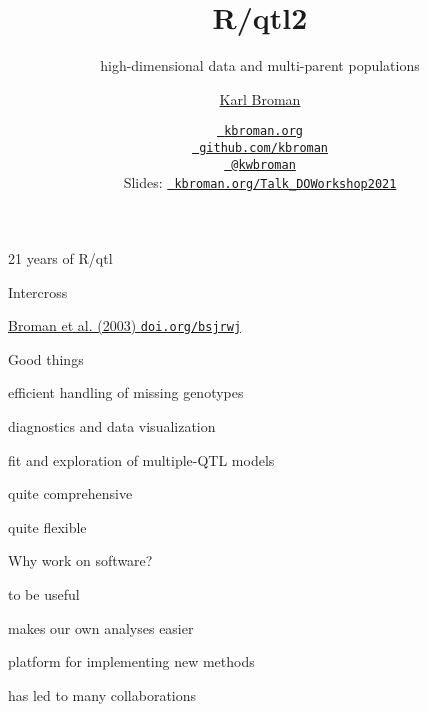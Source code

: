\documentclass[12pt,t,aspectratio=169]{beamer}
\title{R/qtl2}
\subtitle{high-dimensional data and multi-parent populations}
\author{\href{https://kbroman.org}{Karl Broman}}
\institute{Biostatistics \& Medical Informatics, UW{\textendash}Madison}
\date{\href{https://kbroman.org}{\tt \scriptsize \color{foreground} kbroman.org}
\\[-4pt]
\href{https://github.com/kbroman}{\tt \scriptsize \color{foreground} github.com/kbroman}
\\[-4pt]
\href{https://twitter.com/kwbroman}{\tt \scriptsize \color{foreground} @kwbroman}
\\[2pt]
\scriptsize {\lolit Slides:} \href{https://kbroman.org/Talk_DOWorkshop2021}{\tt \scriptsize
  \color{foreground} kbroman.org/Talk\_DOWorkshop2021}
}
\begin{document}
{
 }



\begin{frame}[c]{21 years of R/qtl}


\end{frame}





\begin{frame}[c]{Intercross}
\end{frame}



\begin{frame}[c]{}



\hfill
\href{https://doi.org/10.1093/bioinformatics/btg112}{\scriptsize
  \lolit Broman et al. (2003) {\tt doi.org/bsjrwj}}

\end{frame}






\begin{frame}{Good things}

\bbi
  \item efficient handling of missing genotypes
  \item diagnostics and data visualization
  \item fit and exploration of multiple-QTL models
  \item quite comprehensive
  \item quite flexible
\ei

\end{frame}




\begin{frame}{Why work on software?}

  \bbi
\item to be useful
\item makes our own analyses easier
\item platform for implementing new methods
\item has led to many collaborations
  \ei

\end{frame}
\end{document}
